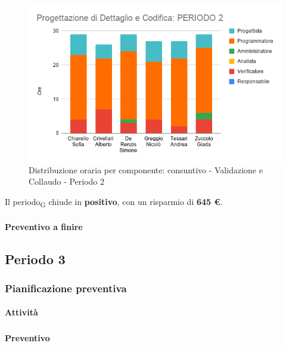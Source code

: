 \begin{figure}[H]
	\centering
	\includegraphics[scale=0.6]{res/images/charts/consuntivo/prog_dett_2.png}
	\caption{Distribuzione oraria per componente: consuntivo - Validazione e Collaudo - Periodo 2}
\end{figure}


Il periodo\textsubscript{G} chiude in \textbf{positivo}, con un risparmio di \textbf{645 \euro}.


\paragraph{Preventivo a finire}
\subparagraph*{}

\pafTable{
	
}







\pagebreak
\subsection{Periodo 3}

\subsubsection{Pianificazione preventiva}

\paragraph{Attività}
\subparagraph*{}

\planningTable{
	
}

\paragraph{Preventivo}
\subparagraph*{}


